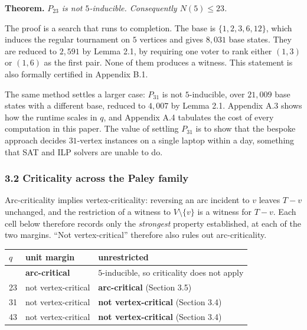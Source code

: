 \documentclass[
]{article}
\newcounter{none} %
\begin{document}
\textbf{Theorem.} \emph{\(P_{23}\) is not \(5\)-inducible. Consequently
\(N(5) \le 23\).}

The proof is a search that runs to completion. The base is
\(\{1,2,3,6,12\}\), which induces the regular tournament on \(5\)
vertices and gives \(8{,}031\) base states. They are reduced to
\(2{,}591\) by Lemma 2.1, by requiring one voter to rank either
\((1,3)\) or \((1,6)\) as the first pair. None of them produces a
witness. This statement is also formally certified in Appendix B.1.

The same method settles a larger case: \(P_{31}\) is not
\(5\)-inducible, over \(21{,}009\) base states with a different base,
reduced to \(4{,}007\) by Lemma 2.1. Appendix A.3 shows how the runtime
scales in \(q\), and Appendix A.4 tabulates the cost of every
computation in this paper. The value of settling \(P_{31}\) is to show
that the bespoke approach decides \(31\)-vertex instances on a single
laptop within a day, something that SAT and ILP solvers are unable to
do.

\subsubsection{3.2 Criticality across the Paley
family}\label{criticality-across-the-paley-family}

Arc-criticality implies vertex-criticality: reversing an arc incident to
\(v\) leaves \(T - v\) unchanged, and the restriction of a witness to
\(V \setminus \{v\}\) is a witness for \(T - v\). Each cell below
therefore records only the \emph{strongest} property established, at
each of the two margins. ``Not vertex-critical'' therefore also rules
out arc-criticality.

{\def\LTcaptype{none} %
\begin{longtable}[]{@{}lll@{}}
\toprule\noalign{}
\(q\) & unit margin & unrestricted \\
\midrule\noalign{}
\endhead
\bottomrule\noalign{}
\endlastfoot
19 & \textbf{arc-critical} & \(5\)-inducible, so criticality does not
apply \\
23 & not vertex-critical & \textbf{arc-critical} (Section 3.5) \\
31 & not vertex-critical & \textbf{not vertex-critical} (Section 3.4) \\
43 & not vertex-critical & \textbf{not vertex-critical} (Section 3.4) \\
\end{longtable}
}
\end{document}
